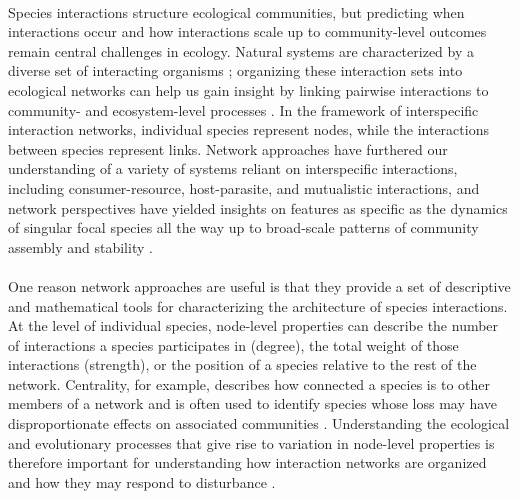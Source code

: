 \paragraph*{} Species interactions structure ecological communities, but predicting when interactions occur and how interactions scale up to community-level outcomes remain central challenges in ecology. Natural systems are characterized by a diverse set of interacting organisms \parencite{Janzen1974Deflowering}; organizing these interaction sets into ecological networks can help us gain insight by linking pairwise interactions to community- and ecosystem-level processes \parencite{lever2014sudden, rohr2014structural}. In the framework of interspecific interaction networks, individual species represent nodes, while the interactions between species represent links. Network approaches have furthered our understanding of a variety of systems reliant on interspecific interactions, including consumer-resource, host-parasite, and mutualistic interactions, and network perspectives have yielded insights on features as specific as the dynamics of singular focal species all the way up to broad-scale patterns of community assembly and stability \parencite{guimaraes2020structure, saravia2022ecological}.

\paragraph*{} One reason network approaches are useful is that they provide a set of descriptive and mathematical tools for characterizing the architecture of species interactions. At the level of individual species, node-level properties can describe the number of interactions a species participates in (degree), the total weight of those interactions (strength), or the position of a species relative to the rest of the network. Centrality, for example, describes how connected a species is to other members of a network and is often used to identify species whose loss may have disproportionate effects on associated communities \parencite{traveset2017plant, maia2019plant, martins2024propagation}. Understanding the ecological and evolutionary processes that give rise to variation in node-level properties is therefore important for understanding how interaction networks are organized and how they may respond to disturbance \parencite{moulatlet2023species, martins2025determinants, zhang2025network}.

